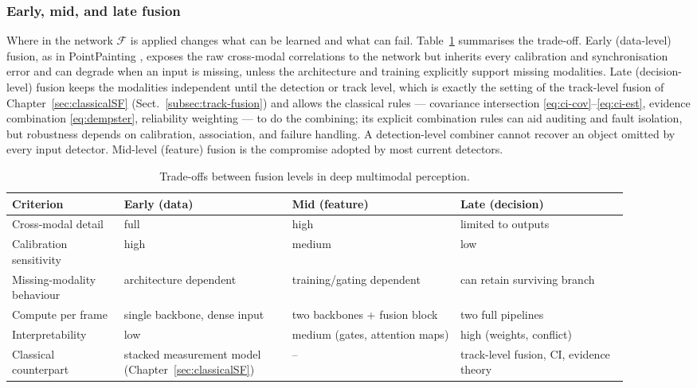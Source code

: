 \subsubsection*{Early, mid, and late fusion}
Where in the network $\mathcal{F}$ is applied changes what can be learned and what can fail. Table~\ref{tab:fusion-level-tradeoff} summarises the trade-off. Early (data-level) fusion, as in PointPainting \cite{vora2020_pointpainting}, exposes the raw cross-modal correlations to the network but inherits every calibration and synchronisation error and can degrade when an input is missing, unless the architecture and training explicitly support missing modalities. Late (decision-level) fusion keeps the modalities independent until the detection or track level, which is exactly the setting of the track-level fusion of Chapter~\ref{sec:classicalSF} (Sect.~\ref{subsec:track-fusion}) and allows the classical rules --- covariance intersection \eqref{eq:ci-cov}--\eqref{eq:ci-est}, evidence combination \eqref{eq:dempster}, reliability weighting --- to do the combining; its explicit combination rules can aid auditing and fault isolation, but robustness depends on calibration, association, and failure handling. A detection-level combiner cannot recover an object omitted by every input detector. Mid-level (feature) fusion is the compromise adopted by most current detectors.
\begin{table}[!t]
    \centering
    \renewcommand{\arraystretch}{1.25}%
    \small
    \setlength{\tabcolsep}{4pt}
    \caption{Trade-offs between fusion levels in deep multimodal perception.}
    \label{tab:fusion-level-tradeoff}
    \begin{tabular}{p{0.16\linewidth} p{0.245\linewidth} p{0.245\linewidth} p{0.245\linewidth}}
        \hline
        \textbf{Criterion} & \textbf{Early (data)} & \textbf{Mid (feature)} & \textbf{Late (decision)} \\
        \hline
        Cross-modal detail & full & high & limited to outputs \\
        Calibration sensitivity & high & medium & low \\
        Missing-modality behaviour & architecture dependent & training/gating dependent & can retain surviving branch \\
        Compute per frame & single backbone, dense input & two backbones + fusion block & two full pipelines \\
        Interpretability & low & medium (gates, attention maps) & high (weights, conflict) \\
        Classical counterpart & stacked measurement model (Chapter~\ref{sec:classicalSF}) & -- & track-level fusion, CI, evidence theory \\
        \hline
    \end{tabular}
\end{table}

